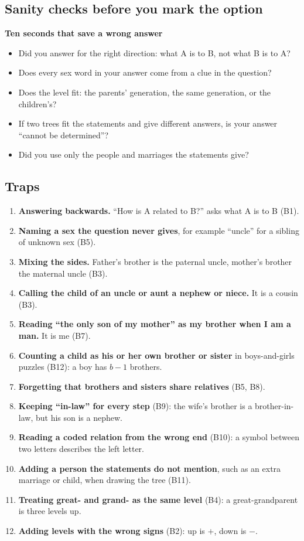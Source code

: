 \documentclass[11pt,a4paper]{article}
\let\oldsubsection\subsection
\renewcommand{\subsection}{\needspace{9\baselineskip}\oldsubsection}
\newcommand{\infobox}[2]{\par\medskip\noindent\begingroup\setlength{\fboxsep}{7pt}%
  \colorbox{codebg}{\parbox{\dimexpr\linewidth-14pt\relax}{\textbf{\color{ember}#1}\par\smallskip #2}}\endgroup\par\medskip}
\begin{document}
\subsection*{Sanity checks before you mark the option}
\infobox{Ten seconds that save a wrong answer}{
\begin{itemize}
\item Did you answer for the right direction: what A is to B, not what B is to A?
\item Does every sex word in your answer come from a clue in the question?
\item Does the level fit: the parents' generation, the same generation, or the children's?
\item If two trees fit the statements and give different answers, is your answer ``cannot be determined''?
\item Did you use only the people and marriages the statements give?
\end{itemize}}

\subsection*{Traps}
\begin{enumerate}
\item \textbf{Answering backwards.} ``How is A related to B?'' asks what A is to B (B1).
\item \textbf{Naming a sex the question never gives}, for example ``uncle'' for a sibling of unknown sex (B5).
\item \textbf{Mixing the sides.} Father's brother is the paternal uncle, mother's brother the maternal uncle (B3).
\item \textbf{Calling the child of an uncle or aunt a nephew or niece.} It is a cousin (B3).
\item \textbf{Reading ``the only son of my mother'' as my brother when I am a man.} It is me (B7).
\item \textbf{Counting a child as his or her own brother or sister} in boys-and-girls puzzles (B12): a boy has $b-1$ brothers.
\item \textbf{Forgetting that brothers and sisters share relatives} (B5, B8).
\item \textbf{Keeping ``in-law'' for every step} (B9): the wife's brother is a brother-in-law, but his son is a nephew.
\item \textbf{Reading a coded relation from the wrong end} (B10): a symbol between two letters describes the left letter.
\item \textbf{Adding a person the statements do not mention}, such as an extra marriage or child, when drawing the tree (B11).
\item \textbf{Treating great- and grand- as the same level} (B4): a great-grandparent is three levels up.
\item \textbf{Adding levels with the wrong signs} (B2): up is $+$, down is $-$.
\end{enumerate}
\end{document}
